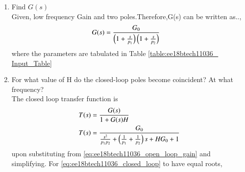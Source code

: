 \begin{enumerate}[label=\arabic*.,ref=\theenumi]

\item Find $G(s)$
\\
\solution Given, low frequency Gain and two poles.Therefore,G(s) can be written as..,
\begin{align}
  G(s) &= \frac{G_0}{\left(1+\frac{s}{p_{1}}\right)\left(1+\frac{s}{p_{2}}\right)} 
\label{eq:ee18btech11036_open_loop_gain} 
\end{align}
where the parameters are tabulated in Table \ref{table:ee18btech11036_ Input_Table}

\begin{table}[!ht]
\centering

\caption{}
\label{table:ee18btech11036_ Input_Table}
\end{table}

\item For what value of H do the closed-loop poles become coincident? At what frequency?\\
\solution The closed loop transfer function is
\begin{align}
\label{eq:ee18btech11036_transfer_function}
    T(s) &= \frac{G(s)}{1+G(s)H} 
\\
    T(s) &= \frac{G_0}{\frac{s^2}{p_1p_2} + \left(\frac{1}{p_1}+\frac{1}{p_2}\right)s + HG_0+1}
    \label{eq:ee18btech11036_closed_loop}
\end{align}
upon substituting from \eqref{eq:ee18btech11036_open_loop_gain}  and simplifying.  
%
For     \eqref{eq:ee18btech11036_closed_loop} to have equal roots,


\end{enumerate}
